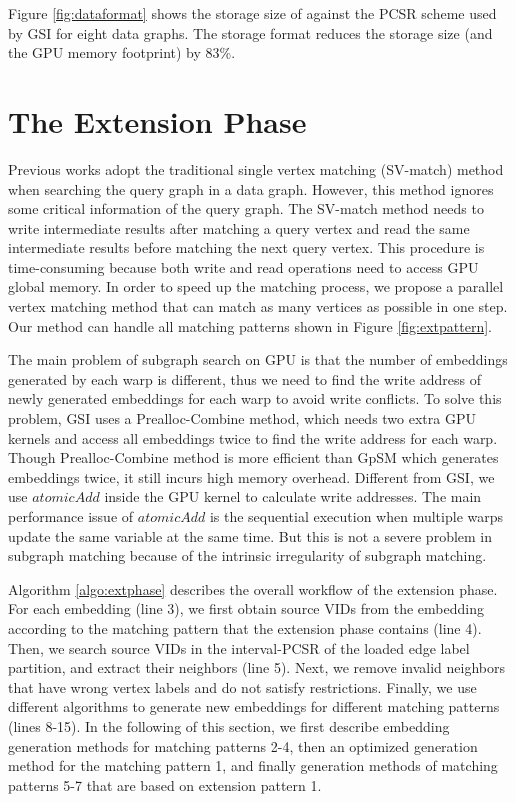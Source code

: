Figure \ref{fig:dataformat} shows the storage size of \SystemName against the PCSR scheme used by GSI for eight data graphs. The \SystemName storage
format reduces the storage size (and the GPU memory footprint) by 83\%.


\section{The Extension Phase\label{sec:extensionphase}}
Previous works \cite{zeng2020gsi,sun2020subgraph} adopt the traditional single vertex matching (SV-match) method when searching the query graph in a data graph. However, this method ignores some critical information of the query graph. The SV-match method needs to write intermediate results after matching a query vertex and read the same intermediate results before matching the next query vertex. This procedure is time-consuming because both write and read operations need to access GPU global memory. In order to speed up the matching process, we propose a parallel vertex matching method that can match as many vertices as possible in one step. Our method can handle all matching patterns shown in Figure \ref{fig:extpattern}.

The main problem of subgraph search on GPU is that the number of embeddings generated by each warp is different, thus we need to find the write address of newly generated embeddings for each warp to avoid write conflicts. To solve this problem, GSI \cite{zeng2020gsi} uses a Prealloc-Combine method, which needs two extra GPU kernels and access all embeddings twice to find the write address for each warp. Though Prealloc-Combine method is more efficient than GpSM \cite{tran2015fast} which generates embeddings twice, it still incurs high memory overhead. Different from GSI, we use $atomicAdd$ inside the GPU kernel to calculate write addresses. The main performance issue of $atomicAdd$ is the sequential execution when multiple warps update the same variable at the same time. But this is not a severe problem in subgraph matching because of the intrinsic irregularity of subgraph matching.


Algorithm \ref{algo:extphase} describes the overall workflow of the extension phase. For each embedding (line 3), we first obtain source VIDs from the embedding according to the matching pattern that the extension phase contains (line 4). Then, we search source VIDs in the interval-PCSR of the loaded edge label partition, and extract their neighbors (line 5).  Next, we remove invalid neighbors that have wrong vertex labels and do not satisfy restrictions. Finally, we use different algorithms to generate new embeddings for different matching patterns (lines 8-15). In the following of this section, we first describe embedding generation methods for matching patterns 2-4, then an optimized generation method for the matching pattern 1, and finally generation methods of matching patterns 5-7 that are based on extension pattern 1. 

